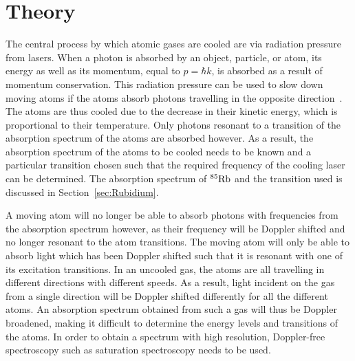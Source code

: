 \documentclass[twocolumn]{article}
\begin{document}
\section{Theory}
The central process by which atomic gases are cooled are via radiation pressure from lasers. When a photon is absorbed by an object, particle, or atom, its energy as well as its momentum, equal to $p=\hbar k$, is absorbed as a result of momentum conservation. This radiation pressure can be used to slow down moving atoms if the atoms absorb photons travelling in the opposite direction~\cite{manual}. The atoms are thus cooled due to the decrease in their kinetic energy, which is proportional to their temperature. Only photons resonant to a transition of the absorption spectrum of the atoms are absorbed however. As a result, the absorption spectrum of the atoms to be cooled needs to be known and a particular transition chosen such that the required frequency of the cooling laser can be determined. The absorption spectrum of $^{85}\ce{Rb}$ and the transition used is discussed in Section~\ref{sec:Rubidium}. \\

\par A moving atom will no longer be able to absorb photons with frequencies from the absorption spectrum however, as their frequency will be Doppler shifted and no longer resonant to the atom transitions. The moving atom will only be able to absorb light which has been Doppler shifted such that it is resonant with one of its excitation transitions. In an uncooled gas, the atoms are all travelling in different directions with different speeds. As a result, light incident on the gas from a single direction will be Doppler shifted differently for all the different atoms. An absorption spectrum obtained from such a gas will thus be Doppler broadened, making it difficult to determine the energy levels and transitions of the atoms. In order to obtain a spectrum with high resolution, Doppler-free spectroscopy such as saturation spectroscopy needs to be used. 

\end{document}
